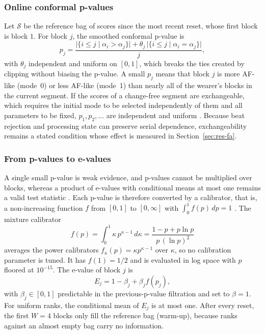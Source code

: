 \documentclass[preprint,12pt]{elsarticle}
\newcommand{\1}{\mathbf{1}}
\begin{document}
\subsubsection{Online conformal p-values}
Let $\mathcal S$ be the reference bag of scores since the most recent reset, whose first block is block $1$. For block $j$, the smoothed conformal p-value is
\begin{equation}
p_j=\frac{\bigl|\{i\le j\mid\alpha_i>\alpha_j\}\bigr|+\theta_j\,\bigl|\{i\le j\mid\alpha_i=\alpha_j\}\bigr|}{j},
\label{eq:pvalue}
\end{equation}
with $\theta_j$ independent and uniform on $[0,1]$, which breaks the ties created by clipping without biasing the p-value. A small $p_j$ means that block $j$ is more AF-like (mode~0) or less AF-like (mode~1) than nearly all of the wearer's blocks in the current segment. If the scores of a change-free segment are exchangeable, which requires the initial mode to be selected independently of them and all parameters to be fixed, $p_1,p_2,\dots$ are independent and uniform \cite{vovk2003testing,vovk2022alrw}. Because beat rejection and processing state can preserve serial dependence, exchangeability remains a stated condition whose effect is measured in Section~\ref{sec:res-fa}.

\subsubsection{From p-values to e-values}
A single small p-value is weak evidence, and p-values cannot be multiplied over blocks, whereas a product of e-values with conditional means at most one remains a valid test statistic \cite{vovk2021evalues,ramdas2023savi}. Each p-value is therefore converted by a calibrator, that is, a non-increasing function $f$ from $[0,1]$ to $[0,\infty]$ with $\int_0^1 f(p)\,dp=1$ \cite{vovk2021evalues}. The mixture calibrator
\begin{equation}
f(p)=\int_0^1 \kappa\,p^{\kappa-1}\,d\kappa=\frac{1-p+p\ln p}{p\,(\ln p)^2}
\label{eq:calibrator}
\end{equation}
averages the power calibrators $f_\kappa(p)=\kappa p^{\kappa-1}$ over $\kappa$, so no calibration parameter is tuned. It has $f(1)=1/2$ and is evaluated in log space with $p$ floored at $10^{-15}$. The e-value of block $j$ is
\begin{equation}
E_j=1-\beta_j+\beta_j f(p_j),
\label{eq:evalue}
\end{equation}
with $\beta_j\in[0,1]$ predictable in the previous-p-value filtration and set to $\beta=1$. For uniform ranks, the conditional mean of $E_j$ is at most one. After every reset, the first $W=4$ blocks only fill the reference bag (warm-up), because ranks against an almost empty bag carry no information.
\end{document}
